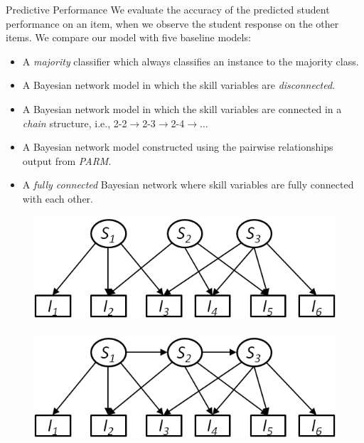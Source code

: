 \documentclass[hyperref={pdfpagelabels=false}]{beamer}
\begin{document}
\begin{frame}{Predictive Performance}
	We evaluate the accuracy of the predicted student performance on an item, when we observe the student response on the other items. We compare our model with five baseline models:
\begin{itemize}\small
		\item  A \emph{majority} classifier which always classifies an instance to the majority class.
		\item  A Bayesian network model in which the skill variables are \emph{disconnected}. 
		\item A Bayesian network model in which the skill variables are connected in a \emph{chain} structure, i.e., 2-2$\rightarrow$2-3$\rightarrow$2-4$\rightarrow\dots$
		\item A Bayesian network model constructed using the pairwise relationships output from \emph{PARM}. 
		\item A \emph{fully connected} Bayesian network where skill variables are fully connected with each other.
\end{itemize}
	\begin{figure}[h]
		\begin{center}\small
			\includegraphics[scale = .4]{figures/disconnected.png}~~
			\includegraphics[scale = .4]{figures/chain.png}~~

\end{center}
\end{figure}
\end{frame}
\end{document}
